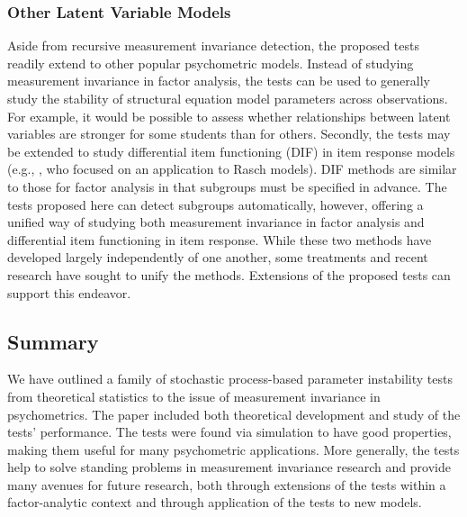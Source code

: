 \documentclass[man]{apa}
\begin{document}
\subsubsection{Other Latent Variable Models}
Aside from recursive measurement invariance detection, the proposed tests
readily extend to other popular psychometric models.  
Instead of studying measurement invariance in factor
analysis, the tests can be used to generally 
study the stability of structural equation model parameters across
observations.  For 
example, it would be possible to assess whether relationships between
latent variables are stronger for some students than for
others.  Secondly, 
the tests may be extended to study differential item functioning (DIF)
in item response models (e.g., , who focused on an
application to Rasch models).  
DIF methods are similar to those for factor analysis in
that subgroups must be specified in advance.  The tests proposed here
can detect subgroups automatically, however, offering a unified way of
studying both 
measurement invariance in factor analysis and differential item
functioning in item response.  While these
two methods have developed largely independently of one another,
some treatments \cite{Mcd99} and recent research \cite{StaChe06} have
sought to unify the methods.  Extensions of the proposed tests can
support this endeavor.

\subsection{Summary}
We have outlined a family of 
stochastic process-based parameter instability tests from theoretical
statistics to the issue of measurement invariance in psychometrics.
The paper included both theoretical development and 
study of the tests' performance.  The tests were found via simulation
to have good properties, making them useful for many psychometric
applications.  More generally, the tests help to
solve standing problems in
measurement invariance research and provide many avenues for
future research, both through extensions of the tests within a
factor-analytic context and through application of the tests to new
models.


\end{document}
